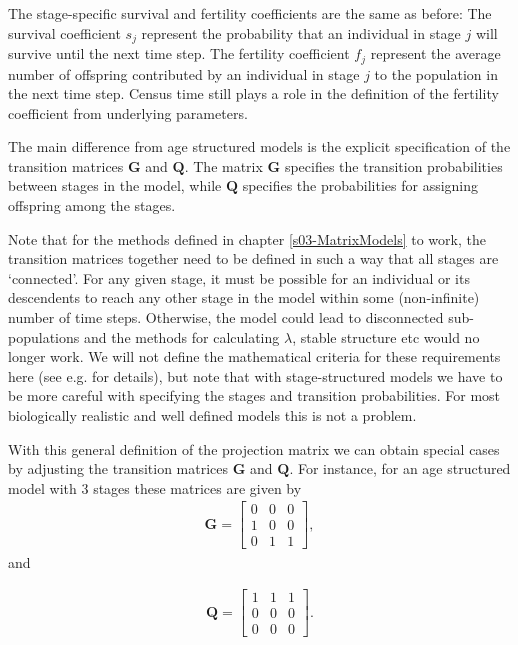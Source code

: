 \documentclass[
]{book}
\begin{document}
The stage-specific survival and fertility coefficients are the same as before: The survival coefficient \(s_j\) represent the probability that an individual in stage \(j\) will survive until the next time step. The fertility coefficient \(f_j\) represent the average number of offspring contributed by an individual in stage \(j\) to the population in the next time step. Census time still plays a role in the definition of the fertility coefficient from underlying parameters.

The main difference from age structured models is the explicit specification of the transition matrices \(\mathbf{G}\) and \(\mathbf{Q}\). The matrix \(\mathbf{G}\) specifies the transition probabilities between stages in the model, while \(\mathbf{Q}\) specifies the probabilities for assigning offspring among the stages.

Note that for the methods defined in chapter \ref{s03-MatrixModels} to work, the transition matrices together need to be defined in such a way that all stages are `connected'. For any given stage, it must be possible for an individual or its descendents to reach any other stage in the model within some (non-infinite) number of time steps. Otherwise, the model could lead to disconnected sub-populations and the methods for calculating \(\lambda\), stable structure etc would no longer work. We will not define the mathematical criteria for these requirements here (see e.g. \citet{Caswell1} for details), but note that with stage-structured models we have to be more careful with specifying the stages and transition probabilities. For most biologically realistic and well defined models this is not a problem.

With this general definition of the projection matrix we can obtain special cases by adjusting the transition matrices \(\mathbf{G}\) and \(\mathbf{Q}\). For instance, for an age structured model with 3 stages these matrices are given by
\begin{align*}
\mathbf{G}=
\left[\begin{matrix} 
0 & 0& 0 \\ 
1 & 0& 0 \\ 
0& 1& 1 
\end{matrix}\right],
\end{align*}
and

\begin{align*}
\mathbf{Q}=
\left[\begin{matrix} 
1 & 1& 1 \\ 
0 & 0& 0 \\ 
0& 0& 0 
\end{matrix}\right].
\end{align*}
\end{document}

